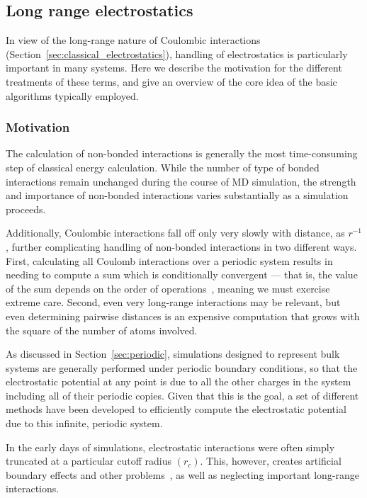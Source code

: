 \documentclass[9pt,bestpractices]{livecoms}
\begin{document}
\subsection{Long range electrostatics}
\label{sec:lr_electrostatics}


In view of the long-range nature of Coulombic interactions (Section~\ref{sec:classical_electrostatics}), handling of electrostatics is particularly important in many systems.
Here we describe the motivation for the different treatments of these terms, and give an overview of the core idea of the basic algorithms typically employed.

\subsubsection{Motivation}

The calculation of non-bonded interactions is generally the most time-consuming step of classical energy calculation.
While the number of type of bonded interactions remain unchanged during the course of MD simulation, the strength and importance of non-bonded interactions varies substantially as a simulation proceeds. 

Additionally, Coulombic interactions fall off only very slowly with distance, as $r^{-1} $, further complicating handling of non-bonded interactions in two different ways.
First, calculating all Coulomb interactions over a periodic system results in needing to compute a sum which is conditionally convergent --- that is, the value of the sum depends on the order of operations~\cite{LeachBook}, meaning we must exercise extreme care.
Second, even very long-range interactions may be relevant, but even determining pairwise distances is an expensive computation that grows with the square of the number of atoms involved.


As discussed in Section~\ref{sec:periodic}, simulations designed to represent bulk systems are generally performed under periodic boundary conditions, so that the electrostatic potential at any point is due to all the other charges in the system including all of their periodic copies. 
Given that this is the goal, a set of different methods have been developed to efficiently compute the electrostatic potential due to this infinite, periodic system. 

In the early days of simulations, electrostatic interactions were often simply truncated at a particular cutoff radius $(r_c)$.
This, however, creates artificial boundary effects and other problems~\cite{allen_computer_2017}, as well as neglecting important long-range interactions.
\end{document}

